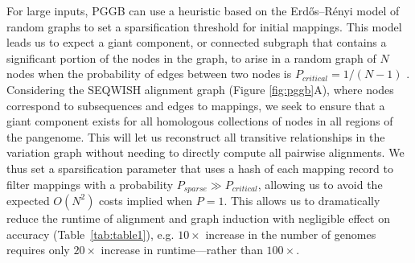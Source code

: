 \documentclass[pdflatex,mathphys]{jnl}%
\theoremstyle{thmstyleone}%
\theoremstyle{thmstyletwo}%
\theoremstyle{thmstylethree}%
\begin{document}
For large inputs, PGGB can use a heuristic based on the Erdős–Rényi model of random graphs to set a sparsification threshold for initial mappings.
This model leads us to expect a giant component, or connected subgraph that contains a significant portion of the nodes in the graph, to arise in a random graph of $N$ nodes when the probability of edges between two nodes is $P_{critical}=1/(N-1)$ \cite{bollobas2001evolution}.
Considering the SEQWISH alignment graph (Figure \ref{fig:pggb}A), where nodes correspond to subsequences and edges to mappings, we seek to ensure that a giant component exists for all homologous collections of nodes in all regions of the pangenome.
This will let us reconstruct all transitive relationships in the variation graph without needing to directly compute all pairwise alignments.
We thus set a sparsification parameter that uses a hash of each mapping record to filter mappings with a probability $P_{sparse} \gg P_{critical}$, allowing us to avoid the expected $O(N^2)$ costs implied when $P=1$.
This allows us to dramatically reduce the runtime of alignment and graph induction with negligible effect on accuracy (Table~\ref{tab:table1}), e.g. $10\times$ increase in the number of genomes requires only $20\times$ increase in runtime---rather than $100\times$.
\end{document}
